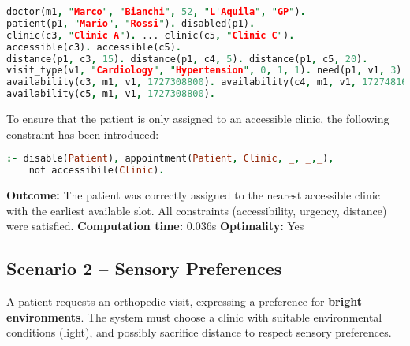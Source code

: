 \documentclass{tlp}
\begin{document}
\begin{lstlisting}[language=Prolog,caption={ASP facts for Scenario 1 – High-priority disabled patient},label={lst:scenario1}]
% Scenario 1: High-priority disabled patient (compressed facts)
doctor(m1, "Marco", "Bianchi", 52, "L'Aquila", "GP").
patient(p1, "Mario", "Rossi"). disabled(p1).
clinic(c3, "Clinic A"). ... clinic(c5, "Clinic C").
accessible(c3). accessible(c5).
distance(p1, c3, 15). distance(p1, c4, 5). distance(p1, c5, 20).
visit_type(v1, "Cardiology", "Hypertension", 0, 1, 1). need(p1, v1, 3).
availability(c3, m1, v1, 1727308800). availability(c4, m1, v1, 1727481600).
availability(c5, m1, v1, 1727308800).
\end{lstlisting}
To ensure that the patient is only assigned to an accessible clinic, the following constraint has been introduced:

\begin{lstlisting}[language=Prolog, caption={Accessibility constraint for disabled patients}]
:- disable(Patient), appointment(Patient, Clinic, _, _,_),
    not accessibile(Clinic).
\end{lstlisting}


\textbf{Outcome:} The patient was correctly assigned to the nearest accessible clinic with the earliest available slot. All constraints (accessibility, urgency, distance) were satisfied. \textbf{Computation time:} 0.036s \textbf{Optimality:} Yes

\vspace{-0.5cm}
\subsection{Scenario 2 – Sensory Preferences}

A patient requests an orthopedic visit, expressing a preference for \textbf{bright environments}. The system must choose a clinic with suitable environmental conditions (light), and possibly sacrifice distance to respect sensory preferences.
\end{document}
